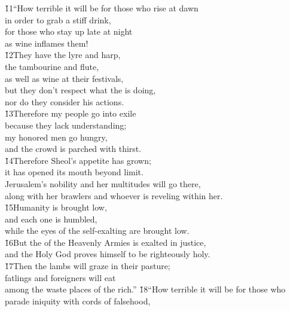 \begin{poetry}
\poeml \v{11}``How terrible it will be for those who rise at dawn \\
\poemll    in order to grab a stiff drink, \\
\poeml for those who stay up late at night \\
\poemll    as wine inflames them! \\
\poeml \v{12}They have the lyre and harp, \\
\poemll    the tambourine and flute, \\
\poemlll       as well as wine at their festivals, \\
\poeml but they don't respect what the  is doing, \\
\poemll    nor do they consider his actions. \\
\poeml \v{13}Therefore my people go into exile \\
\poemll    because they lack understanding; \\
\poeml my honored men go hungry, \\
\poemll    and the crowd is parched with thirst. \\
\poeml \v{14}Therefore Sheol's appetite has grown; \\
\poemll    it has opened its mouth beyond limit. \\
\poeml Jerusalem's nobility and her multitudes will go there, \\
\poemll    along with her brawlers and whoever is reveling within her. \\
\poeml \v{15}Humanity is brought low, \\
\poemll    and each one is humbled, \\
\poemlll       while the eyes of the self-exalting are brought low. \\
\poeml \v{16}But the  of the Heavenly Armies is exalted in justice, \\
\poemll    and the Holy God proves himself to be righteously holy. \\
\poeml \v{17}Then the lambs will graze in their pasture; \\
\poemll    fatlings and foreigners will eat \\
\poemlll       among the waste places of the rich.''
\poeml \v{18}``How terrible it will be for those who parade iniquity with cords of falsehood, \\

\end{poetry}
